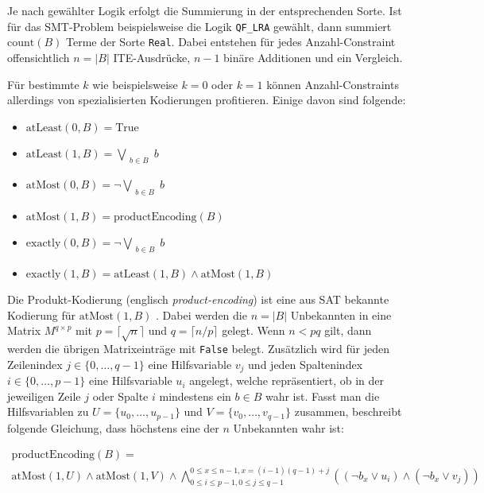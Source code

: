 Je nach gewählter Logik erfolgt die Summierung in der entsprechenden Sorte.
Ist für das SMT-Problem beispielsweise die Logik \texttt{QF\_LRA} gewählt, dann summiert $\text{count}(B)$ Terme der Sorte \texttt{Real}.
Dabei entstehen für jedes Anzahl-Constraint offensichtlich $n = \lvert B \rvert$ ITE-Ausdrücke, $n-1$ binäre Additionen und ein Vergleich.

Für bestimmte $k$ wie beispielsweise $k = 0$ oder $k = 1$ können Anzahl-Constraints allerdings von spezialisierten Kodierungen profitieren.
Einige davon sind folgende:
\begin{itemize}
    \item $\text{atLeast}(0,B) = \text{True}$
    \item $\text{atLeast}(1,B) = \bigvee\limits_{\substack{b \in B}} b $
    \item $\text{atMost}(0,B) = \neg\bigvee\limits_{\substack{b \in B}} b$
    \item $\text{atMost}(1,B) = \text{productEncoding}(B)$
    \item $\text{exactly}(0,B) = \neg\bigvee\limits_{\substack{b \in B}} b$
    \item $\text{exactly}(1,B) = \text{atLeast}(1,B) \land \text{atMost}(1,B)$
\end{itemize}

Die Produkt-Kodierung (englisch \textit{product-encoding}) ist eine aus SAT bekannte Kodierung für $\text{atMost}(1,B)$ \cite{amoChen}.
Dabei werden die $n = \lvert B \rvert$ Unbekannten in eine Matrix $M^{q \times p}$ mit $p = \lceil \sqrt {n} \rceil$ und $q = \lceil n/p \rceil$ gelegt.
Wenn $n < pq$ gilt, dann werden die übrigen Matrixeinträge mit \texttt{False} belegt.
Zusätzlich wird für jeden Zeilenindex $j \in \{0,\ldots,q-1\}$ eine Hilfsvariable $v_j$ und jeden Spaltenindex $i \in \{0,\ldots,p-1\}$ eine Hilfsvariable $u_i$ angelegt,
welche repräsentiert, ob in der jeweiligen Zeile $j$ oder Spalte $i$ mindestens ein $b \in B$ wahr ist.
Fasst man die Hilfsvariablen zu $U = \{ u_0,\ldots, u_{p-1} \}$ und $V = \{ v_0,\ldots, v_{q-1} \}$ zusammen, beschreibt folgende Gleichung,
dass höchstens eine der $n$ Unbekannten wahr ist:

\begin{multline*}
    \text{productEncoding}(B) = \\
    \text{atMost}(1,U) \land \text{atMost}(1,V) \land \bigwedge_{0 \leq i \leq p-1, 0 \leq j \leq q-1}^{0 \leq x \leq n-1, x = (i-1)(q-1)+j} ((\neg b_x \lor u_i) \land (\neg b_x \lor v_j))
\end{multline*}

